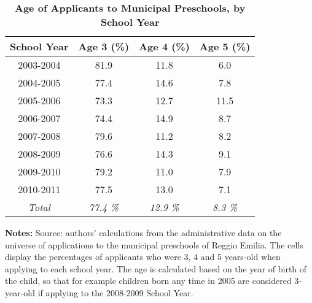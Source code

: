 
\begin{table}[ht!]
\caption{\textbf{\small Age of Applicants to Municipal Preschools, by School Year}}
\label{tab:AgeApps}
\begin{center}
\begin{tabular}{ c c c c }
\hline\hline
\textbf{School Year} & \textbf{Age 3 (\%)} & \textbf{Age 4 (\%)} & \textbf{Age 5 (\%)} \\
\hline
	2003-2004  &  81.9  &    11.8  &    6.0   \\[0.2em]
	2004-2005  &  77.4  &    14.6  &    7.8   \\[0.2em]
	2005-2006  &  73.3  &    12.7  &   11.5   \\[0.2em]
	2006-2007  &  74.4  &    14.9  &    8.7   \\[0.2em]
	2007-2008  &  79.6  &    11.2  &    8.2   \\[0.2em]
	2008-2009  &  76.6  &    14.3  &    9.1   \\[0.2em]
	2009-2010  &  79.2  &    11.0  &    7.9   \\[0.2em]
	2010-2011  &  77.5  &    13.0  &    7.1   \\[0.2em]
\hline
	\textit{Total}  &  \textit{77.4 \% } & \textit{12.9 \% } & \textit{8.3 \%}   \\[0.2em]
\hline
\end{tabular}
\end{center}
\begin{flushleft}
\tiny{{\bfseries Notes:} Source: authors' calculations from the administrative data on the universe of applications to the municipal preschools of Reggio Emilia. The cells display the percentages of applicants who were 3, 4 and 5 years-old when applying to each school year. The age is calculated based on the year of birth of the child, so that for example children born any time in 2005 are considered 3-year-old if applying to the 2008-2009 School Year.}
\end{flushleft}
\end{table}
